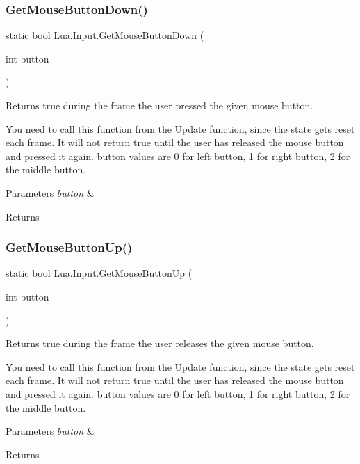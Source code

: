 \subsubsection{\texorpdfstring{GetMouseButtonDown()}{GetMouseButtonDown()}}
{\footnotesize\ttfamily static bool Lua.\+Input.\+Get\+Mouse\+Button\+Down (\begin{DoxyParamCaption}\item[{int}]{button }\end{DoxyParamCaption})\hspace{0.3cm}{\ttfamily [static]}}



Returns true during the frame the user pressed the given mouse button. 

You need to call this function from the Update function, since the state gets reset each frame. It will not return true until the user has released the mouse button and pressed it again. button values are 0 for left button, 1 for right button, 2 for the middle button. 
\begin{DoxyParams}{Parameters}
{\em button} & \\
\hline
\end{DoxyParams}
\begin{DoxyReturn}{Returns}

\end{DoxyReturn}
\mbox{\label{class_lua_1_1_input_ac9d47356c504c74bfcbee5fff1e9939b}} 
\subsubsection{\texorpdfstring{GetMouseButtonUp()}{GetMouseButtonUp()}}
{\footnotesize\ttfamily static bool Lua.\+Input.\+Get\+Mouse\+Button\+Up (\begin{DoxyParamCaption}\item[{int}]{button }\end{DoxyParamCaption})\hspace{0.3cm}{\ttfamily [static]}}



Returns true during the frame the user releases the given mouse button. 

You need to call this function from the Update function, since the state gets reset each frame. It will not return true until the user has released the mouse button and pressed it again. button values are 0 for left button, 1 for right button, 2 for the middle button. 
\begin{DoxyParams}{Parameters}
{\em button} & \\
\hline
\end{DoxyParams}
\begin{DoxyReturn}{Returns}

\end{DoxyReturn}


